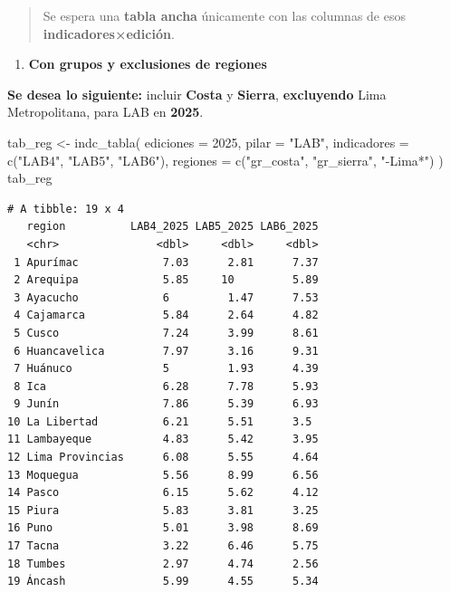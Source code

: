 \documentclass[
  11pt,
  letterpaper,
  DIV=11,
  numbers=noendperiod]{scrartcl}
\newenvironment{Shaded}{\begin{snugshade}}{\end{snugshade}}
\newcommand{\AttributeTok}[1]{\textcolor[rgb]{0.40,0.45,0.13}{#1}}
\newcommand{\DecValTok}[1]{\textcolor[rgb]{0.68,0.00,0.00}{#1}}
\newcommand{\FunctionTok}[1]{\textcolor[rgb]{0.28,0.35,0.67}{#1}}
\newcommand{\NormalTok}[1]{\textcolor[rgb]{0.00,0.23,0.31}{#1}}
\newcommand{\OtherTok}[1]{\textcolor[rgb]{0.00,0.23,0.31}{#1}}
\newcommand{\StringTok}[1]{\textcolor[rgb]{0.13,0.47,0.30}{#1}}
\providecommand{\tightlist}{%
  \setlength{\itemsep}{0pt}\setlength{\parskip}{0pt}}\usepackage{longtable,booktabs,array}
\begin{document}
\begin{quote}
Se espera una \textbf{tabla ancha} únicamente con las columnas de esos
\textbf{indicadores×edición}.
\end{quote}

\begin{enumerate}
\def\labelenumi{\arabic{enumi}.}
\setcounter{enumi}{3}
\tightlist
\item
  \textbf{Con grupos y exclusiones de regiones}
\end{enumerate}

\textbf{Se desea lo siguiente:} incluir \textbf{Costa} y
\textbf{Sierra}, \textbf{excluyendo} Lima Metropolitana, para LAB en
\textbf{2025}.

\begin{Shaded}
\begin{Highlighting}[]
\NormalTok{tab\_reg }\OtherTok{\textless{}{-}} \FunctionTok{indc\_tabla}\NormalTok{(}
  \AttributeTok{ediciones    =} \DecValTok{2025}\NormalTok{,}
  \AttributeTok{pilar        =} \StringTok{"LAB"}\NormalTok{,}
  \AttributeTok{indicadores  =} \FunctionTok{c}\NormalTok{(}\StringTok{"LAB4"}\NormalTok{, }\StringTok{"LAB5"}\NormalTok{, }\StringTok{"LAB6"}\NormalTok{),}
  \AttributeTok{regiones     =} \FunctionTok{c}\NormalTok{(}\StringTok{"gr\_costa"}\NormalTok{, }\StringTok{"gr\_sierra"}\NormalTok{, }\StringTok{"{-}Lima*"}\NormalTok{)}
\NormalTok{)}
\NormalTok{tab\_reg}
\end{Highlighting}
\end{Shaded}

\begin{verbatim}
# A tibble: 19 x 4
   region          LAB4_2025 LAB5_2025 LAB6_2025
   <chr>               <dbl>     <dbl>     <dbl>
 1 Apurímac             7.03      2.81      7.37
 2 Arequipa             5.85     10         5.89
 3 Ayacucho             6         1.47      7.53
 4 Cajamarca            5.84      2.64      4.82
 5 Cusco                7.24      3.99      8.61
 6 Huancavelica         7.97      3.16      9.31
 7 Huánuco              5         1.93      4.39
 8 Ica                  6.28      7.78      5.93
 9 Junín                7.86      5.39      6.93
10 La Libertad          6.21      5.51      3.5 
11 Lambayeque           4.83      5.42      3.95
12 Lima Provincias      6.08      5.55      4.64
13 Moquegua             5.56      8.99      6.56
14 Pasco                6.15      5.62      4.12
15 Piura                5.83      3.81      3.25
16 Puno                 5.01      3.98      8.69
17 Tacna                3.22      6.46      5.75
18 Tumbes               2.97      4.74      2.56
19 Áncash               5.99      4.55      5.34
\end{verbatim}
\end{document}
